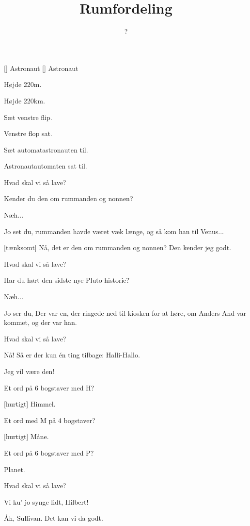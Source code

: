 \documentclass[a4paper,11pt]{article}
\title{Rumfordeling}
\author{?}
\begin{document}
\maketitle

\begin{roles}
[] Astronaut
[] Astronaut
\end{roles}

\begin{sketch}

 Højde 220m.

 Højde 220km.

 Sæt venstre flip.

 Venstre flop sat.

 Sæt automatastronauten til.

 Astronautautomaten sat til.


 Hvad skal vi så lave?

 Kender du den om rummanden og nonnen?

 Næh...

 Jo set du, rummanden havde været væk længe, og så kom han til
Venus...

[tænksomt] Nå, det er den om rummanden og nonnen?  Den kender
jeg godt.


 Hvad skal vi så lave?

 Har du hørt den sidste nye Pluto-historie?

 Næh...

 Jo ser du, Der var en, der ringede ned til kiosken for at
høre, om Anders And var kommet, og der var han.


 Hvad skal vi så lave?

 Nå!  Så er der kun én ting tilbage: Halli-Hallo.

 Jeg vil være den!


 Et ord på 6 bogstaver med H?

[hurtigt] Himmel.

 Et ord med M på 4 bogstaver?

[hurtigt] Måne.

 Et ord på 6 bogstaver med P?

 Planet.


 Hvad skal vi så lave?

 Vi ku' jo synge lidt, Hilbert!

 Åh, Sullivan.  Det kan vi da godt.


\end{sketch}
\end{document}

